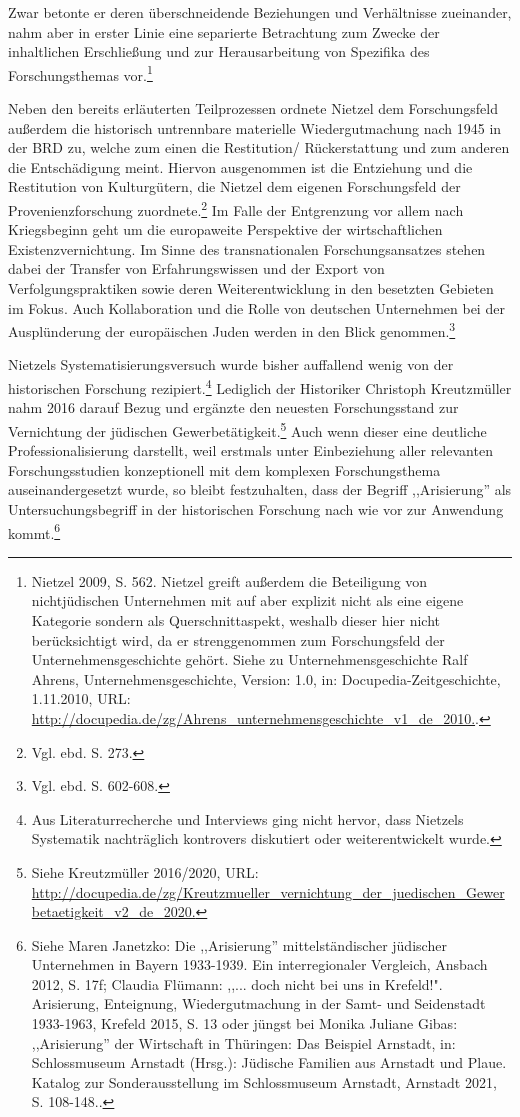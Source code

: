 Zwar betonte er deren überschneidende Beziehungen und Verhältnisse zueinander, nahm aber in erster Linie eine separierte Betrachtung zum Zwecke der inhaltlichen Erschließung und zur Herausarbeitung von Spezifika des Forschungsthemas vor.\footnote{Nietzel 2009, S. 562. Nietzel greift außerdem die Beteiligung von nichtjüdischen Unternehmen mit auf aber explizit nicht als eine eigene Kategorie sondern als Querschnittaspekt, weshalb dieser hier nicht berücksichtigt wird, da er strenggenommen zum Forschungsfeld der Unternehmensgeschichte gehört. Siehe zu Unternehmensgeschichte Ralf Ahrens, Unternehmensgeschichte, Version: 1.0, in: Docupedia-Zeitgeschichte, 1.11.2010, URL: \url{http://docupedia.de/zg/Ahrens_unternehmensgeschichte_v1_de_2010.}.} 

Neben den bereits erläuterten Teilprozessen ordnete Nietzel dem Forschungsfeld außerdem die historisch untrennbare materielle Wiedergutmachung nach 1945 in der BRD zu, welche zum einen die Restitution/ Rückerstattung und zum anderen die Entschädigung meint. Hiervon ausgenommen ist die Entziehung und die Restitution von Kulturgütern, die Nietzel dem eigenen Forschungsfeld der Provenienzforschung zuordnete.\footnote{Vgl. ebd. S. 273.} Im Falle der Entgrenzung vor allem nach Kriegsbeginn geht um die europaweite Perspektive der wirtschaftlichen Existenzvernichtung. Im Sinne des transnationalen Forschungsansatzes stehen dabei der Transfer von Erfahrungswissen und der Export von Verfolgungspraktiken sowie deren Weiterentwicklung in den besetzten Gebieten im Fokus. Auch Kollaboration und die Rolle von deutschen Unternehmen bei der Ausplünderung der europäischen Juden werden in den Blick genommen.\footnote{Vgl. ebd. S. 602-608.}

Nietzels Systematisierungsversuch wurde bisher auffallend wenig von der historischen Forschung rezipiert.\footnote{Aus Literaturrecherche und Interviews ging nicht hervor, dass Nietzels Systematik nachträglich kontrovers diskutiert oder weiterentwickelt wurde.} Lediglich der Historiker Christoph Kreutzmüller nahm 2016 darauf Bezug und ergänzte den neuesten Forschungsstand zur Vernichtung der jüdischen Gewerbetätigkeit.\footnote{Siehe Kreutzmüller 2016/2020,  URL: \url{http://docupedia.de/zg/Kreutzmueller_vernichtung_der_juedischen_Gewerbetaetigkeit_v2_de_2020.}} Auch wenn dieser eine deutliche Professionalisierung darstellt, weil erstmals unter Einbeziehung aller relevanten Forschungsstudien konzeptionell mit dem komplexen Forschungsthema auseinandergesetzt wurde, so bleibt festzuhalten, dass der Begriff ,,Arisierung'' als Untersuchungsbegriff in der historischen Forschung nach wie vor zur Anwendung kommt.\footnote{Siehe Maren Janetzko: Die ,,Arisierung'' mittelständischer jüdischer Unternehmen in Bayern 1933-1939. Ein interregionaler Vergleich, Ansbach 2012, S. 17f; Claudia Flümann: ,,... doch nicht bei uns in Krefeld!". Arisierung, Enteignung, Wiedergutmachung in der Samt- und Seidenstadt 1933-1963, Krefeld 2015, S. 13 oder jüngst bei Monika Juliane Gibas: ,,Arisierung'' der Wirtschaft in Thüringen: Das Beispiel Arnstadt, in: Schlossmuseum Arnstadt (Hrsg.): Jüdische Familien aus Arnstadt und Plaue. Katalog zur Sonderausstellung im Schlossmuseum Arnstadt, Arnstadt 2021, S. 108-148..}  

